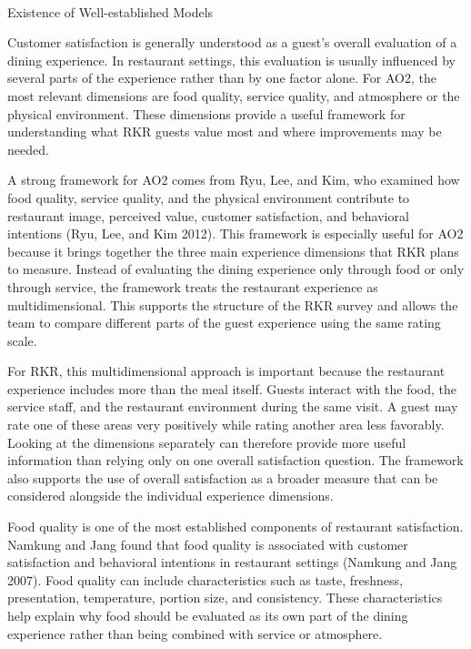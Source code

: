 \documentclass[
  12pt,
  letterpaper,
  DIV=11,
  numbers=noendperiod]{scrartcl}
\makeatletter
\let\oldparagraph\paragraph
\renewcommand{\paragraph}{
    \@ifstar
      \xxxParagraphStar
      \xxxParagraphNoStar
  }
\newcommand{\xxxParagraphStar}[1]{\oldparagraph*{#1}\mbox{}}
\newcommand{\xxxParagraphNoStar}[1]{\oldparagraph{#1}\mbox{}}
\makeatother
\begin{document}
\paragraph{Existence of Well-established
Models}\label{existence-of-well-established-models-1}

Customer satisfaction is generally understood as a guest's overall
evaluation of a dining experience. In restaurant settings, this
evaluation is usually influenced by several parts of the experience
rather than by one factor alone. For AO2, the most relevant dimensions
are food quality, service quality, and atmosphere or the physical
environment. These dimensions provide a useful framework for
understanding what RKR guests value most and where improvements may be
needed.

A strong framework for AO2 comes from Ryu, Lee, and Kim, who examined
how food quality, service quality, and the physical environment
contribute to restaurant image, perceived value, customer satisfaction,
and behavioral intentions (Ryu, Lee, and Kim 2012). This framework is
especially useful for AO2 because it brings together the three main
experience dimensions that RKR plans to measure. Instead of evaluating
the dining experience only through food or only through service, the
framework treats the restaurant experience as multidimensional. This
supports the structure of the RKR survey and allows the team to compare
different parts of the guest experience using the same rating scale.

For RKR, this multidimensional approach is important because the
restaurant experience includes more than the meal itself. Guests
interact with the food, the service staff, and the restaurant
environment during the same visit. A guest may rate one of these areas
very positively while rating another area less favorably. Looking at the
dimensions separately can therefore provide more useful information than
relying only on one overall satisfaction question. The framework also
supports the use of overall satisfaction as a broader measure that can
be considered alongside the individual experience dimensions.

Food quality is one of the most established components of restaurant
satisfaction. Namkung and Jang found that food quality is associated
with customer satisfaction and behavioral intentions in restaurant
settings (Namkung and Jang 2007). Food quality can include
characteristics such as taste, freshness, presentation, temperature,
portion size, and consistency. These characteristics help explain why
food should be evaluated as its own part of the dining experience rather
than being combined with service or atmosphere.
\end{document}
